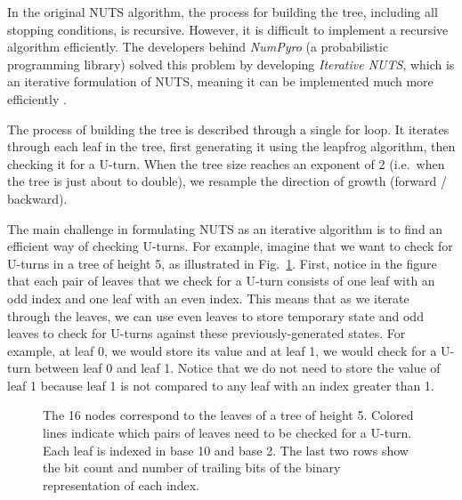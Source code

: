 \documentclass[12pt]{article}
\begin{document}
In the original NUTS algorithm, the process for building the tree, including all stopping conditions, is recursive. However, it is difficult to implement a recursive algorithm efficiently. The developers behind \textit{NumPyro} (a probabilistic programming library) solved this problem by developing \textit{Iterative NUTS}, which is an iterative formulation of NUTS, meaning it can be implemented much more efficiently \cite{numpyro}.

The process of building the tree is described through a single for loop. It iterates through each leaf in the tree, first generating it using the leapfrog algorithm, then checking it for a U-turn. When the tree size reaches an exponent of 2 (i.e.\ when the tree is just about to double), we resample the direction of growth (forward / backward).

The main challenge in formulating NUTS as an iterative algorithm is to find an efficient way of checking U-turns. For example, imagine that we want to check for U-turns in a tree of height 5, as illustrated in Fig.\ \ref{fig_iterative_nuts_indexing}. First, notice in the figure that each pair of leaves that we check for a U-turn consists of one leaf with an odd index and one leaf with an even index. This means that as we iterate through the leaves, we can use even leaves to store temporary state and odd leaves to check for U-turns against these previously-generated states. For example, at leaf 0, we would store its value and at leaf 1, we would check for a U-turn between leaf 0 and leaf 1. Notice that we do not need to store the value of leaf 1 because leaf 1 is not compared to any leaf with an index greater than 1.

\begin{figure}
\centering
{}
\caption{The 16 nodes correspond to the leaves of a tree of height 5. Colored lines indicate which pairs of leaves need to be checked for a U-turn. Each leaf is indexed in base 10 and base 2. The last two rows show the bit count and number of trailing bits of the binary representation of each index.}
\label{fig_iterative_nuts_indexing}
\end{figure}
\end{document}
